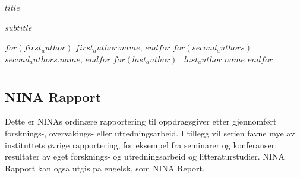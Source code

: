 \documentclass[11pt, a4paper]{article}
\begin{document}


\begin{titlepage}
\thispagestyle{titlefooter}


\huge{$title$} \par\vspace{.3cm}
\LARGE{$subtitle$} \par\vspace{.6cm}
$for(first_author)$
\hspace{0cm}\Large{$first_author.name$},
$endfor$
$for(second_authors)$
\hspace{-2mm}~\Large{$second_authors.name$},
$endfor$
$for(last_author)$
\hspace{-2mm}~\Large{$last_author.name$}
$endfor$

\restoregeometry
\end{titlepage}
\cfoot{}

\section*{}
\hspace{1ex}

\subsection*{\small{NINA Rapport}}
{\normalsize Dette er NINAs ordinære rapportering til oppdragsgiver etter gjennomført forsknings\hyp{}, overvåkings\hyp{} eller utredningsarbeid. I tillegg vil serien favne mye av instituttets øvrige rapportering, for eksempel fra seminarer og konferanser, resultater av eget forsknings\hyp{} og utredningsarbeid og litteraturstudier. NINA Rapport kan også utgis på engelsk, som NINA Report.
}
\end{document}

